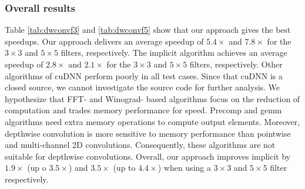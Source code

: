 \subsubsection{Overall results}
Table \ref{tab:dwconvf3} and \ref{tab:dwconvf5} show that our approach gives the best speedups. 
Our approach delivers an average speedup of $5.4\times$ and $7.8\times$ for the $3 \times 3$ and $5 \times 5$ filters, respectively. 
The implicit algorithm achieves an average speedup of $2.8\times$ and $2.1\times$ for the $3 \times 3$ and $5 \times 5$ filters, respectively.
Other algorithms of cuDNN perform poorly in all test cases. 
Since that cuDNN is a closed source, we cannot investigate the source code for further analysis. 
We hypothesize that FFT- and Winograd- based algorithms focus on the reduction of computation and trades memory performance for speed. 
Precomp and gemm algorithms need extra memory operations to compute output elements. 
Moreover, depthwise convolution is more sensitive to memory performance than pointwise and multi-channel 2D convolutions. 
Consequently, these algorithms are not suitable for depthwise convolutions. 
Overall, our approach improves implicit by $1.9\times$ (up o $3.5\times$) and $3.5\times$ (up to $4.4\times$) when using a $3 \times 3$ and $5 \times 5$ filter respectively.
